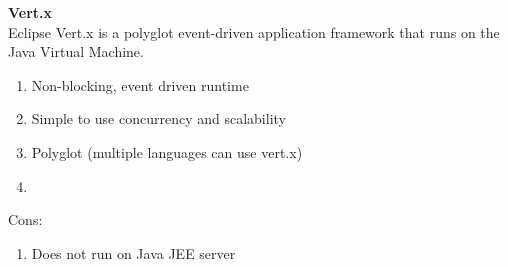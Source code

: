 
\textbf{Vert.x} \\
Eclipse Vert.x is a polyglot event-driven application framework that runs on the Java Virtual Machine.
		\begin{enumerate}
	\item Non-blocking, event driven runtime
	\item Simple to use concurrency and scalability
	\item Polyglot (multiple languages can use vert.x)
	\item 
\end{enumerate}
Cons:
\begin{enumerate}
	\item Does not run on Java JEE server
\end{enumerate}